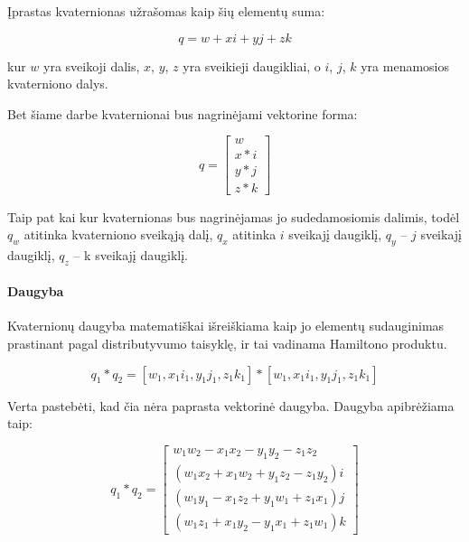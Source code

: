 \documentclass[12pt, a4paper, lithuanian, final]{article}
\begin{document}
Įprastas kvaternionas užrašomas kaip šių elementų suma:

\begin{equation}
	q = w + xi + yj + zk
\end{equation}

kur $w$ yra sveikoji dalis, $x$, $y$, $z$ yra sveikieji daugikliai, o $i$, $j$, $k$ yra menamosios kvaterniono dalys.

Bet šiame darbe kvaternionai bus nagrinėjami vektorine forma:

\begin{equation}
	q = \left[
		\begin{array}{c}
			w \\
			x * i \\
			y * j \\
			z * k
		\end{array}
	\right]
\end{equation}

Taip pat kai kur kvaternionas bus nagrinėjamas jo sudedamosiomis dalimis, todėl $q_w$ atitinka kvaterniono sveikąją dalį, $q_x$ atitinka $i$ sveikajį daugiklį, $q_y$ -- $j$ sveikajį daugiklį, $q_z$ -- k sveikajį daugiklį.



\paragraph{Daugyba}

Kvaternionų daugyba matematiškai išreiškiama kaip jo elementų sudauginimas prastinant pagal distributyvumo taisyklę, ir tai vadinama Hamiltono produktu.

\begin{equation}
	q_1 * q_2 = \left[ w_1, x_1 i_1, y_1j_1, z_1k_1 \right] * \left[ w_1, x_1 i_1, y_1j_1, z_1k_1 \right]
\end{equation}

Verta pastebėti, kad čia nėra paprasta vektorinė daugyba.
Daugyba apibrėžiama taip:

\begin{equation}
	q_1 * q_2 = \left[
		\begin{array}{c}
			w_1 w_2 - x_1 x_2 - y_1 y_2 - z_1 z_2 \\
			(w_1 x_2 + x_1 w_2 + y_1 z_2 - z_1 y_2) i \\
			(w_1 y_1 - x_1 z_2 + y_1 w_1 + z_1 x_1) j \\
			(w_1 z_1 + x_1 y_2 - y_1 x_1 + z_1 w_1) k
		\end{array}
	\right]
\end{equation}
\end{document}
